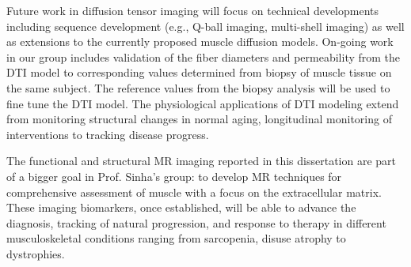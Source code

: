 Future work in diffusion tensor imaging will focus on technical developments including sequence development (e.g., Q-ball imaging, multi-shell imaging) as well as extensions to the currently proposed muscle diffusion models. 
On-going work in our group includes validation of the fiber diameters and permeability from the DTI model to corresponding values determined from biopsy of muscle tissue on the same subject. 
The reference values from the biopsy analysis will be used to fine tune the DTI model. 
The physiological applications of DTI modeling extend from monitoring structural changes in normal aging, longitudinal monitoring of interventions to tracking disease progress.

The functional and structural MR imaging reported in this dissertation are part of a bigger goal in Prof. Sinha's group: to develop MR techniques for comprehensive assessment of muscle with a focus on the extracellular matrix.
 These imaging biomarkers, once established, will be able to advance the diagnosis, tracking of natural progression, and response to therapy in different musculoskeletal conditions ranging from sarcopenia, disuse atrophy to dystrophies. 